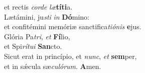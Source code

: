 \evenverse et rectis \textit{cor}\textit{de} \textit{læ}\textbf{tí}\textbf{ti}a.\\
\oddverse Lætámini, ju\textit{sti} \textit{in} \textbf{Dó}mino:~\*\\
\oddverse et confitémini memóriæ sanctifica\textit{ti}\textit{ó}\textit{nis} \textbf{e}jus.\\
\evenverse Glória Pa\textit{tri}, \textit{et} \textbf{Fí}lio,~\*\\
\evenverse et Spi\textit{rí}\textit{tu}\textit{i} \textbf{San}cto.\\
\oddverse Sicut erat in princípio, et \textit{nunc}, \textit{et} \textbf{sem}per,~\*\\
\oddverse et in sǽcula sæ\textit{cu}\textit{ló}\textit{rum}. \textbf{A}men.\\
